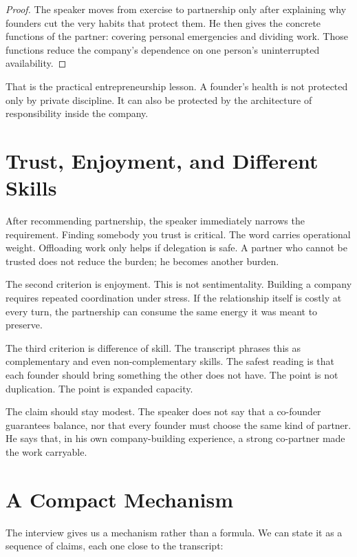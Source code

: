 \begin{proof}
The speaker moves from exercise to partnership only after explaining why founders cut the very habits that protect them. He then gives the concrete functions of the partner: covering personal emergencies and dividing work. Those functions reduce the company's dependence on one person's uninterrupted availability.
\end{proof}

That is the practical entrepreneurship lesson. A founder's health is not protected only by private discipline. It can also be protected by the architecture of responsibility inside the company.

\section{Trust, Enjoyment, and Different Skills}

After recommending partnership, the speaker immediately narrows the requirement. Finding somebody you trust is critical. The word carries operational weight. Offloading work only helps if delegation is safe. A partner who cannot be trusted does not reduce the burden; he becomes another burden.

The second criterion is enjoyment. This is not sentimentality. Building a company requires repeated coordination under stress. If the relationship itself is costly at every turn, the partnership can consume the same energy it was meant to preserve.

The third criterion is difference of skill. The transcript phrases this as complementary and even non-complementary skills. The safest reading is that each founder should bring something the other does not have. The point is not duplication. The point is expanded capacity.

\begin{remark}
The claim should stay modest. The speaker does not say that a co-founder guarantees balance, nor that every founder must choose the same kind of partner. He says that, in his own company-building experience, a strong co-partner made the work carryable.
\end{remark}

\section{A Compact Mechanism}

The interview gives us a mechanism rather than a formula. We can state it as a sequence of claims, each one close to the transcript:

